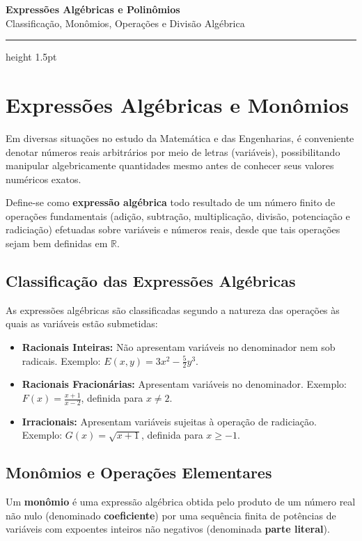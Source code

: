 \documentclass[12pt,a4paper]{article}
\begin{document}
\begin{center}
  \vspace*{-0.3cm}
  {\LARGE\bfseries\color{primary} Expressões Algébricas e Polinômios} \\[0.2cm]
  {\small\sffamily\color{gray} Classificação, Monômios, Operações e Divisão Algébrica}
  \vspace*{0.3cm}
  \hrule height 1.5pt \color{primary}
\end{center}

\vspace{0.3cm}

\section{Expressões Algébricas e Monômios}

Em diversas situações no estudo da Matemática e das Engenharias, é conveniente denotar números reais arbitrários por meio de letras (variáveis), possibilitando manipular algebricamente quantidades mesmo antes de conhecer seus valores numéricos exatos.

Define-se como \textbf{expressão algébrica} todo resultado de um número finito de operações fundamentais (adição, subtração, multiplicação, divisão, potenciação e radiciação) efetuadas sobre variáveis e números reais, desde que tais operações sejam bem definidas em $\mathbb{R}$.

\subsection{Classificação das Expressões Algébricas}
As expressões algébricas são classificadas segundo a natureza das operações às quais as variáveis estão submetidas:
\begin{itemize}[leftmargin=*]
    \item \textbf{Racionais Inteiras:} Não apresentam variáveis no denominador nem sob radicais. Exemplo: $E(x,y) = 3x^2 - \frac{5}{2}y^3$.
    \item \textbf{Racionais Fracionárias:} Apresentam variáveis no denominador. Exemplo: $F(x) = \frac{x+1}{x-2}$, definida para $x \neq 2$.
    \item \textbf{Irracionais:} Apresentam variáveis sujeitas à operação de radiciação. Exemplo: $G(x) = \sqrt{x+1}$, definida para $x \ge -1$.
\end{itemize}

\subsection{Monômios e Operações Elementares}
Um \textbf{monômio} é uma expressão algébrica obtida pelo produto de um número real não nulo (denominado \textbf{coeficiente}) por uma sequência finita de potências de variáveis com expoentes inteiros não negativos (denominada \textbf{parte literal}).
\end{document}
